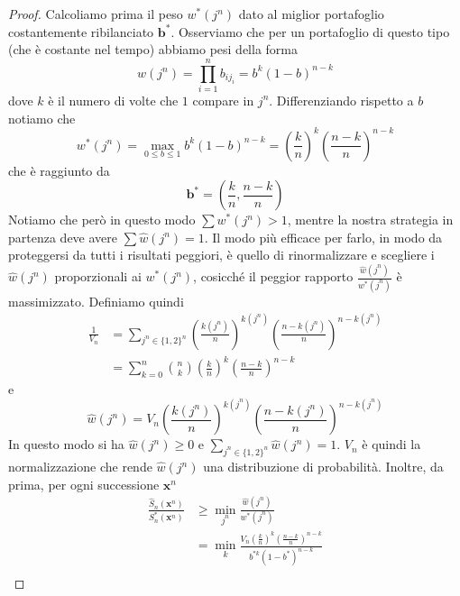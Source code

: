 \documentclass[a4paper,11pt]{book}
\theoremstyle{plain}
\theoremstyle{definition}
\theoremstyle{remark}
\newcommand{\x}{\bm{x}}
\newcommand{\B}{\bm{b}}
\newcommand{\Sh}{\hat{S}}
\begin{document}
\begin{proof}
	Calcoliamo prima il peso $w^*(j^n)$ dato al miglior portafoglio costantemente ribilanciato $\B^*$. Osserviamo che per un portafoglio di questo tipo (che è costante nel tempo) abbiamo pesi della forma
	\begin{equation*}
		w(j^n)=\prod_{i = 1}^n{b_{ij_i}}=b^k(1-b)^{n-k}
	\end{equation*}
	dove $k$ è il numero di volte che $1$ compare in $j^n$.\newline
	Differenziando rispetto a $b$ notiamo che
	\begin{equation*}
		w^*(j^n) =\max\limits_{0\leq b\leq 1}b^k(1-b)^{n-k}=\left(\frac{k}{n}\right)^k\left(\frac{n-k}{n}\right)^{n-k}
	\end{equation*}
	che è raggiunto da
	\begin{equation*}
		\B^*=\left(\frac{k}{n},\frac{n-k}{n}\right)
	\end{equation*}
	Notiamo che però in questo modo $\sum w^*(j^n)>1$, mentre la nostra strategia in partenza deve avere $\sum \hat{w}(j^n)=1$. Il modo più efficace per farlo, in modo da proteggersi da tutti i risultati peggiori, è quello di rinormalizzare e scegliere i $\hat{w}(j^n)$ proporzionali ai $w^*(j^n)$, cosicché il peggior rapporto $\frac{\hat{w}(j^n)}{w^*(j^n)}$ è massimizzato.\newline
	Definiamo quindi
	\begin{equation*}
		\begin{split}
		\frac{1}{V_n}&=\sum_{j^n\in\{1,2\}^n}{\left(\frac{k(j^n)}{n}\right)^{k(j^n)}\left(\frac{n-k(j^n)}{n}\right)^{n-k(j^n)}}\\
		& = \sum_{k = 0}^n{\binom{n}{k}\left(\frac{k}{n}\right)^k\left(\frac{n-k}{n}\right)^{n-k}}
		\end{split}
	\end{equation*}
	e
	\begin{equation}\label{eq:strategy-weight}
		\hat{w}(j^n)=V_n\left(\frac{k(j^n)}{n}\right)^{k(j^n)}\left(\frac{n-k(j^n)}{n}\right)^{n-k(j^n)}
	\end{equation}
	In questo modo si ha $\hat{w}(j^n)\geq 0$ e $\sum_{j^n\in\{1,2\}^n}\hat{w}(j^n) = 1$. $V_n$ è quindi la normalizzazione che rende $\hat{w}(j^n)$ una distribuzione di probabilità. Inoltre, da prima, per ogni successione $\x^n$
	\begin{equation*}
		\begin{split}
		\frac{\Sh_n(\x^n)}{S_n^*(\x^n)} & \geq \min\limits_{j^n}\frac{\hat{w}(j^n)}{w^*(j^n)}\\
		& = \min\limits_k\frac{V_n\left(\frac{k}{n}\right)^k\left(\frac{n-k}{n}\right)^{n-k}}{b^{*k}(1-b^*)^{n-k}}\\

\end{split}
\end{equation*}
\end{proof}
\end{document}

